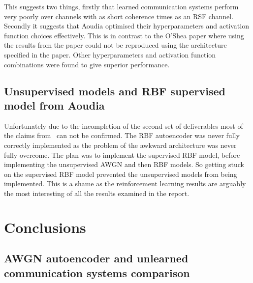 \documentclass[12pt,onecolumn,letterpaper]{article}
\begin{document}
This suggests two things, firstly that learned communication systems perform very poorly over channels with as short coherence times as an RSF channel. Secondly it suggests that Aoudia \etal optimised their hyperparameters and activation function choices effectively. This is in contrast to the O'Shea paper where using the results from the paper could not be reproduced using the architecture specified in the paper. Other hyperparameters and activation function combinations were found to give superior performance. 

\subsection{Unsupervised models and RBF supervised model from Aoudia \etal}

Unfortunately due to the incompletion of the second set of deliverables most of the claims from~\cite{Aoudia} can not be confirmed. The RBF autoencoder was never fully correctly implemented as the problem of the awkward architecture was never fully overcome. The plan was to implement the supervised RBF model, before implementing the unsupervised AWGN and then RBF models. So getting stuck on the supervised RBF model prevented the unsupervised models from being implemented. This is a shame as the reinforcement learning results are arguably the most interesting of all the results examined in the report.


\FloatBarrier
\section{Conclusions}

\subsection{AWGN autoencoder and unlearned communication systems comparison}
\end{document}
